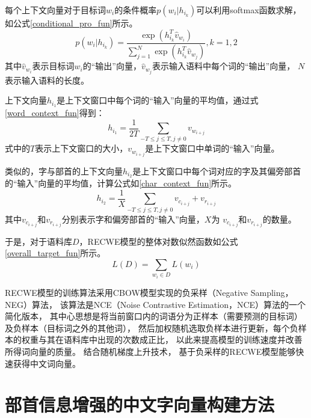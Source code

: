 每个上下文向量对于目标词$w_i$的条件概率$p\left( w_i|h_{i_k}\right )$可以利用softmax函数求解，
如公式\ref{conditional_pro_fun}所示。
\begin{equation}
    p\left ( w_i | h_{i_k} \right )=\frac{\exp \left ( h_{i_k}^{T}\hat{v}_{w_i} \right )}{\sum_{j=1}^{N}\exp \left ( h_{i_k}^{T}\hat{v}_{w_j} \right )},k=1,2
    \label{conditional_pro_fun}
\end{equation}
其中$\hat{v}_{w_i}$表示目标词$w_i$的“输出”向量，$\hat{v}_{w_j}$表示输入语料中每个词的“输出”向量，
$N$表示输入语料的长度。

上下文向量$h_{i_1}$是上下文窗口中每个词的“输入”向量的平均值，通过式\ref{word_context_fun}得到：
\begin{equation}
    h_{i_1}=\frac{1}{2T}\sum_{-T\leq j\leq T,j\neq 0}v_{w_{i+j}}
    \label{word_context_fun}
\end{equation}
式中的$T$表示上下文窗口的大小，$v_{w_{i+j}}$是上下文窗口中单词的“输入”向量。

类似的，字与部首的上下文向量$h_{i_2}$是上下文窗口中每个词对应的字及其偏旁部首的“输入”向量的平均值，计算公式如\ref{char_context_fun}所示。
\begin{equation}
    h_{i_2}=\frac{1}{X}\sum_{-T\leq j\leq T,j\neq 0} v_{c_{i+j}}+v_{r_{i+j}}
    \label{char_context_fun}
\end{equation}
其中$v_{c_{i+j}}$和$v_{r_{i+j}}$分别表示字和偏旁部首的“输入”向量，$X$为
$v_{c_{i+j}}$和$v_{r_{i+j}}$的数量。

于是，对于语料库$D$，RECWE模型的整体对数似然函数如公式\ref{overall_target_fun}所示。
\begin{equation}
    L\left ( D \right )=\sum_{w_i \in D}L\left ( w_i \right )
    \label{overall_target_fun}
\end{equation}

RECWE模型的训练算法采用CBOW模型实现的负采样（Negative Sampling，NEG）算法，
该算法是NCE（Noise Contrastive Estimation，NCE）算法的一个简化版本，
其中心思想是将当前窗口内的词语分为正样本（需要预测的目标词）及负样本（目标词之外的其他词），
然后加权随机选取负样本进行更新，每个负样本的权重与其在语料库中出现的次数成正比，
以此来提高模型的训练速度并改善所得词向量的质量。
结合随机梯度上升技术，
基于负采样的RECWE模型能够快速获得中文词向量。




\section{部首信息增强的中文字向量构建方法}
